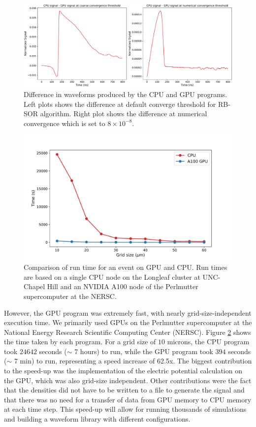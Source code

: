 \begin{figure}[!ht]
\centering
 \includegraphics[width=0.99\linewidth]{ch4/figs/converge_threshold_dif.pdf}
\caption{Difference in waveforms produced by the CPU and GPU programs. Left plots shows the difference at default converge threshold for RB-SOR algorithm. Right plot shows the difference at numerical convergence which is set to $8\times10^{-8}$.}
\label{ch4_fig_cov_thres_diff} 
\end{figure}

\begin{figure}[!htb]
\centering
 \includegraphics[width=0.99\linewidth]{ch4/figs/cpu_gpu_comp.pdf}
\caption{ Comparison of run time for an {\ehd} event on GPU and CPU. Run times are based on a single CPU node on the Longleaf cluster at UNC-Chapel Hill and an NVIDIA A100 node of the Perlmutter supercomputer at the NERSC.}
\label{fig:GPU_time}
\end{figure}

However, the GPU program was extremely fast, with nearly grid-size-independent execution time. We primarily used GPUs on the Perlmutter supercomputer at the National Energy Research Scientific Computing Center (NERSC). Figure \ref{fig:GPU_time} shows the time taken by each program. For a grid size of $10$ microns, the CPU program took $24642$ seconds ($\sim$ 7 hours) to run, while the GPU program took $394$ seconds ($\sim$ 7 min) to run, representing a speed increase of 62.5x. The biggest contribution to the speed-up was the implementation of the electric potential calculation on the GPU, which was also grid-size independent. Other contributions were the fact that the densities did not have to be written to a file to generate the signal and that there was no need for a transfer of data from GPU memory to CPU memory at each time step. This speed-up will allow for running thousands of simulations and building a waveform library with different configurations.

